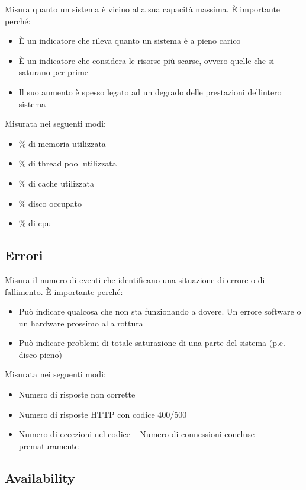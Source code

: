 Misura quanto un sistema è vicino alla sua capacità massima. È
importante perché:

\begin{itemize}
\item
  È un indicatore che rileva quanto un sistema è a pieno carico
\item
  È un indicatore che considera le risorse più scarse, ovvero quelle che
  si saturano per prime
\item
  Il suo aumento è spesso legato ad un degrado delle prestazioni
  dell\textquotesingle intero sistema
\end{itemize}

Misurata nei seguenti modi:

\begin{itemize}
\item
  \% di memoria utilizzata
\item
  \% di thread pool utilizzata
\item
  \% di cache utilizzata
\item
  \% disco occupato
\item
  \% di cpu
\end{itemize}

\subsection{Errori}\label{errori}

Misura il numero di eventi che identificano una situazione di errore o
di fallimento. È importante perché:

\begin{itemize}
\item
  Può indicare qualcosa che non sta funzionando a dovere. Un errore
  software o un hardware prossimo alla rottura
\item
  Può indicare problemi di totale saturazione di una parte del sistema
  (p.e. disco pieno)
\end{itemize}

Misurata nei seguenti modi:

\begin{itemize}
\item
  Numero di risposte non corrette
\item
  Numero di risposte HTTP con codice 400/500
\item
  Numero di eccezioni nel codice -- Numero di connessioni concluse
  prematuramente
\end{itemize}

\subsection{Availability}\label{availability}

